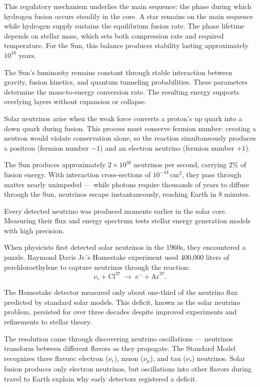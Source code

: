 This regulatory mechanism underlies the main sequence: the phase during which hydrogen fusion occurs steadily in the core. A star remains on the main sequence while hydrogen supply sustains the equilibrium fusion rate. The phase lifetime depends on stellar mass, which sets both compression rate and required temperature. For the Sun, this balance produces stability lasting approximately $10^{10}$ years.

The Sun's luminosity remains constant through stable interaction between gravity, fusion kinetics, and quantum tunneling probabilities. These parameters determine the mass-to-energy conversion rate. The resulting energy supports overlying layers without expansion or collapse.

Solar neutrinos arise when the weak force converts a proton's up quark into a down quark during fusion. This process must conserve fermion number: creating a neutron would violate conservation alone, so the reaction simultaneously produces a positron (fermion number $-1$) and an electron neutrino (fermion number $+1$).

The Sun produces approximately $2 \times 10^{38}$ neutrinos per second, carrying $2\%$ of fusion energy. With interaction cross-sections of $10^{-44}\,\text{cm}^2$, they pass through matter nearly unimpeded — while photons require thousands of years to diffuse through the Sun, neutrinos escape instantaneously, reaching Earth in 8 minutes.

Every detected neutrino was produced moments earlier in the solar core. Measuring their flux and energy spectrum tests stellar energy generation models with high precision.

When physicists first detected solar neutrinos in the 1960s, they encountered a puzzle. Raymond Davis Jr.'s Homestake experiment used 400,000 liters of perchloroethylene to capture neutrinos through the reaction:
\[
\nu_e + \text{Cl}^{37} \;\to\; e^- + \text{Ar}^{37}.
\]

The Homestake detector measured only about one-third of the neutrino flux predicted by standard solar models. This deficit, known as the solar neutrino problem, persisted for over three decades despite improved experiments and refinements to stellar theory.

The resolution came through discovering neutrino oscillations — neutrinos transform between different flavors as they propagate. The Standard Model recognizes three flavors: electron ($\nu_e$), muon ($\nu_\mu$), and tau ($\nu_\tau$) neutrinos. Solar fusion produces only electron neutrinos, but oscillations into other flavors during travel to Earth explain why early detectors registered a deficit.

